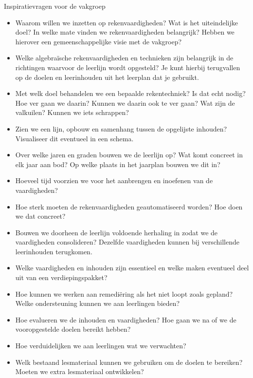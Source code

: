 \begin{kader}{}{Inspiratievragen voor de vakgroep}
	\begin{itemize}[label=\textcolor{\rubriekkleur}{\Large\textbullet}]
	\item Waarom willen we inzetten op rekenvaardigheden? Wat is het uiteindelijke doel? In welke mate vinden we rekenvaardigheden belangrijk? Hebben we hierover een gemeenschappelijke visie met de vakgroep?
	\item Welke algebraïsche rekenvaardigheden en technieken zijn belangrijk in de richtingen waarvoor de leerlijn wordt opgesteld? Je kunt hierbij terugvallen op de doelen en leerinhouden uit het leerplan dat je gebruikt.
	\item Met welk doel behandelen we een bepaalde rekentechniek? Is dat echt nodig? Hoe ver gaan we daarin? Kunnen we daarin ook te ver gaan? Wat zijn de valkuilen? Kunnen we iets schrappen?
	\item Zien we een lijn, opbouw en samenhang tussen de opgelijste inhouden? Visualiseer dit eventueel in een schema.
	\item Over welke jaren en graden bouwen we de leerlijn op? Wat komt concreet in elk jaar aan bod? Op welke plaats in het jaarplan bouwen we dit in?
	\item Hoeveel tijd voorzien we voor het aanbrengen en inoefenen van de vaardigheden?
	\item Hoe sterk moeten de rekenvaardigheden geautomatiseerd worden? Hoe doen we dat concreet?
	\item Bouwen we doorheen de leerlijn voldoende herhaling in zodat we de vaardigheden consolideren? Dezelfde vaardigheden kunnen bij verschillende leerinhouden terugkomen.
	\item Welke vaardigheden en inhouden zijn essentieel en welke maken eventueel deel uit van een verdiepingspakket?
	\item Hoe kunnen we werken aan remediëring als het niet loopt zoals gepland? Welke ondersteuning kunnen we aan leerlingen bieden?
	\item Hoe evalueren we de inhouden en vaardigheden? Hoe gaan we na of we de vooropgestelde doelen bereikt hebben?
	\item Hoe verduidelijken we aan leerlingen wat we verwachten?
	\item Welk bestaand lesmateriaal kunnen we gebruiken om de doelen te bereiken? Moeten we extra lesmateriaal ontwikkelen?
	\end{itemize}
\end{kader}


